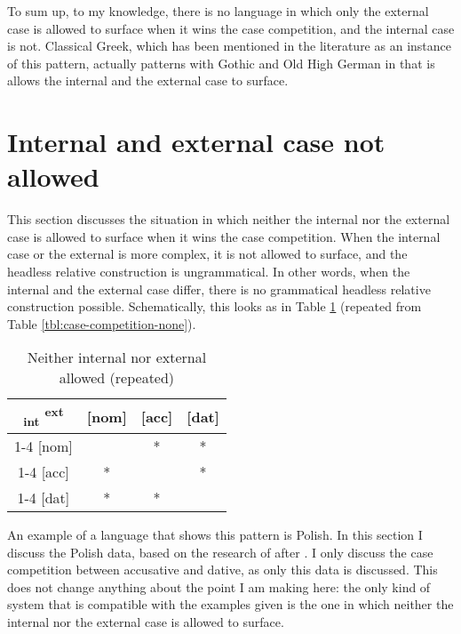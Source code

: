 To sum up, to my knowledge, there is no language in which only the external case is allowed to surface when it wins the case competition, and the internal case is not. Classical Greek, which has been mentioned in the literature as an instance of this pattern, actually patterns with Gothic and Old High German in that is allows the internal and the external case to surface.



\section{Internal and external case not allowed}\label{sec:pattern-iv}

This section discusses the situation in which neither the internal nor the external case is allowed to surface when it wins the case competition. When the internal case or the external is more complex, it is not allowed to surface, and the headless relative construction is ungrammatical. In other words, when the internal and the external case differ, there is no grammatical headless relative construction possible. Schematically, this looks as in Table \ref{tbl:case-competition-none-repeated} (repeated from Table \ref{tbl:case-competition-none}).

\begin{table}[H]
  \center
  \caption{Neither internal nor external allowed (repeated)}
  \begin{tabular}{c|c|c|c}
    \toprule
    \textsubscript{\ac{int}} \textsuperscript{\ac{ext}}
           & [\ac{nom}]
           & [\ac{acc}]
           & [\ac{dat}]
           \\ \cmidrule{1-4}
       [\ac{nom}]
           & \xcancel{\phantom{xx}}
           & *
           & *
           \\ \cmidrule{1-4}
       [\ac{acc}]
           & *
           & \xcancel{\phantom{xx}}
           & *
           \\ \cmidrule{1-4}
       [\ac{dat}]
           & *
           & *
           & \xcancel{\phantom{xx}}
           \\
     \bottomrule
  \end{tabular}
    \label{tbl:case-competition-none-repeated}
\end{table}

An example of a language that shows this pattern is Polish. In this section I discuss the Polish data, based on the research of \citet{citko2013} after \citet{himmelreich2017}. I only discuss the case competition between accusative and dative, as only this data is discussed. This does not change anything about the point I am making here: the only kind of system that is compatible with the examples given is the one in which neither the internal nor the external case is allowed to surface.

